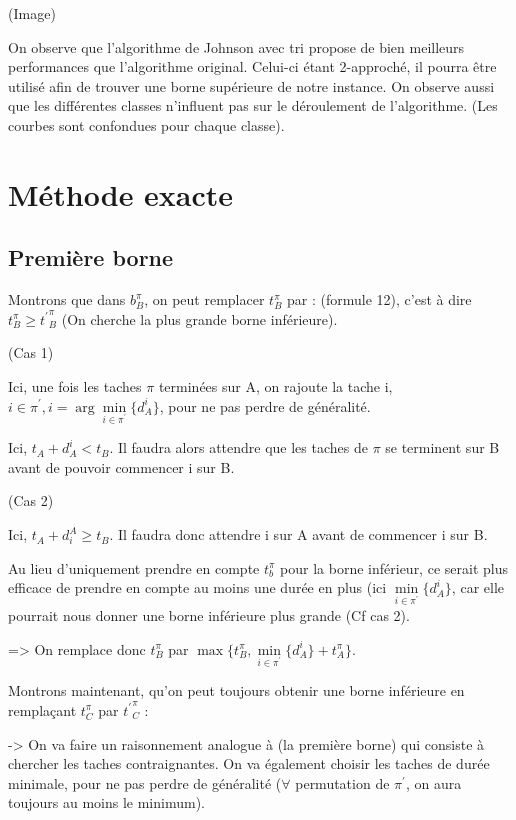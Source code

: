 \documentclass[12pt]{article}
\begin{document}
(Image)

On observe que l'algorithme de Johnson avec tri propose de bien meilleurs performances que l'algorithme original.
Celui-ci étant 2-approché, il pourra être utilisé afin de trouver une borne supérieure de notre instance.
On observe aussi que les différentes classes n'influent pas sur le déroulement de l'algorithme. (Les courbes sont confondues pour chaque classe).


\section{Méthode exacte}

\subsection{Première borne}

Montrons que dans $b_B^\pi$, on peut remplacer $t_B^\pi$ par :
(formule 12), c'est à dire $t_B^\pi \ge {t^\prime}_B^\pi$ (On cherche la plus grande borne inférieure).

(Cas 1)

Ici, une fois les taches $\pi$ terminées sur A, on rajoute la tache i, $i\in{\pi}^\prime,i = {\arg\min\limits_{i\in{\pi^\prime}}}\{d_A^i\}$, pour ne pas perdre de généralité.

Ici, $t_A + d_A^i < t_B$. Il faudra alors attendre que les taches de $\pi$ se terminent sur B avant de pouvoir commencer i sur B.

(Cas 2)

Ici, $t_A + d_i^A \ge t_B$. Il faudra donc attendre i sur A avant de commencer i sur B.

Au lieu d'uniquement prendre en compte $t_b^\pi$ pour la borne inférieur, ce serait plus efficace de prendre en compte au moins une durée en plus (ici $\min\limits_{i\in{\pi^\prime}}\{d_A^i\}$, car elle pourrait nous donner une borne inférieure plus grande (Cf cas 2).

=> On remplace donc $t_B^\pi$ par $\max\{t_B^\pi,\min\limits_{i\in{\pi^\prime}}\{d_A^i\}+t_A^\pi\}$.


Montrons maintenant, qu'on peut toujours obtenir une borne inférieure en remplaçant $t_C^\pi$ par ${t^\prime}_C^\pi$ :

-> On va faire un raisonnement analogue à (la première borne) qui consiste à chercher les taches contraignantes. On va également choisir les taches de durée minimale, pour ne pas perdre de généralité ($\forall$ permutation de $\pi^\prime$, on aura toujours au moins le minimum).
\end{document}
